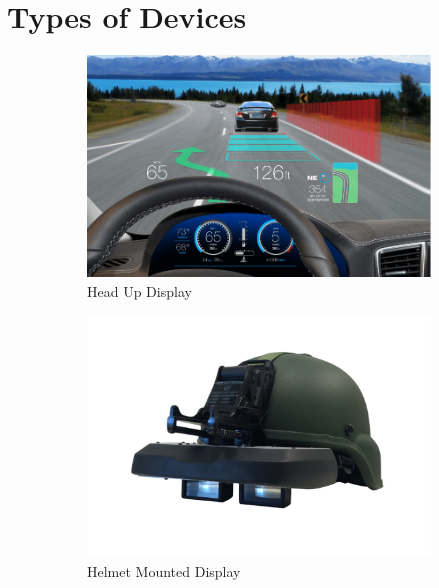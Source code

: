 \documentclass[12 pct]{report}
\begin{document}
\section{Types of Devices}
\begin{figure}[h!]
  \centering
  \begin{subfigure}[b]{0.4\linewidth}
    \includegraphics[width=\linewidth]{head-up}
    \caption{Head Up Display}
    \label{fig:headupdisplay}
  \end{subfigure}
  \begin{subfigure}[b]{0.4\linewidth}
    \includegraphics[width=\linewidth]{helmet-mounted}
    \caption{Helmet Mounted Display}
    \label{fig:helmetdisplay}
  \end{subfigure}
  \begin{subfigure}[b]{0.4\linewidth}

\end{subfigure}
\end{figure}
\end{document}
